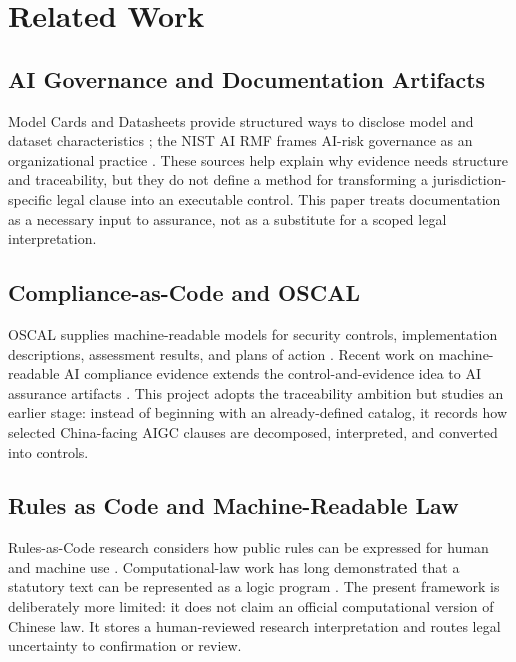 \documentclass[10pt,journal]{IEEEtran}
\begin{document}
\section{Related Work}

\subsection{AI Governance and Documentation Artifacts}

Model Cards and Datasheets provide structured ways to disclose model and dataset characteristics \cite{mitchell2019model,gebru2021datasheets}; the NIST AI RMF frames AI-risk governance as an organizational practice \cite{nistAiRmf2023}. These sources help explain why evidence needs structure and traceability, but they do not define a method for transforming a jurisdiction-specific legal clause into an executable control. This paper treats documentation as a necessary input to assurance, not as a substitute for a scoped legal interpretation.

\subsection{Compliance-as-Code and OSCAL}

OSCAL supplies machine-readable models for security controls, implementation descriptions, assessment results, and plans of action \cite{nistOscal}. Recent work on machine-readable AI compliance evidence extends the control-and-evidence idea to AI assurance artifacts \cite{ugarte2026evidence}. This project adopts the traceability ambition but studies an earlier stage: instead of beginning with an already-defined catalog, it records how selected China-facing AIGC clauses are decomposed, interpreted, and converted into controls.

\subsection{Rules as Code and Machine-Readable Law}

Rules-as-Code research considers how public rules can be expressed for human and machine use \cite{mohun2020cracking}. Computational-law work has long demonstrated that a statutory text can be represented as a logic program \cite{sergot1986nationality}. The present framework is deliberately more limited: it does not claim an official computational version of Chinese law. It stores a human-reviewed research interpretation and routes legal uncertainty to confirmation or review.
\end{document}
